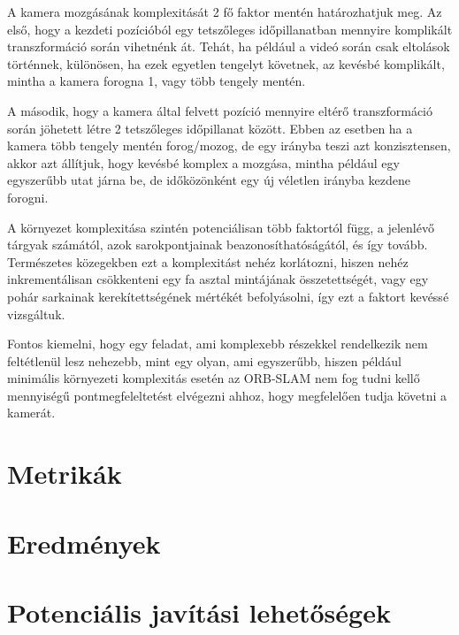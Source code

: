 A kamera mozgásának komplexitását 2 fő faktor mentén határozhatjuk meg.
Az első, hogy a kezdeti pozícióból egy tetszőleges időpillanatban mennyire komplikált transzformáció során vihetnénk át.
Tehát, ha például a videó során csak eltolások történnek, különösen, ha ezek egyetlen tengelyt követnek, az kevésbé komplikált, mintha a kamera forogna 1, vagy több tengely mentén.

A második, hogy a kamera által felvett pozíció mennyire eltérő transzformáció során jöhetett létre 2 tetszőleges időpillanat között.
Ebben az esetben ha a kamera több tengely mentén forog/mozog, de egy irányba teszi azt konzisztensen, akkor azt állítjuk, hogy kevésbé komplex a mozgása, mintha például egy egyszerűbb utat járna be, de időközönként egy új véletlen irányba kezdene forogni.

A környezet komplexitása szintén potenciálisan több faktortól függ, a jelenlévő tárgyak számától, azok sarokpontjainak beazonosíthatóságától, és így tovább.
Természetes közegekben ezt a komplexitást nehéz korlátozni, hiszen nehéz inkrementálisan csökkenteni egy fa asztal mintájának összetettségét, vagy egy pohár sarkainak kerekítettségének mértékét befolyásolni, így ezt a faktort kevéssé vizsgáltuk.

Fontos kiemelni, hogy egy feladat, ami komplexebb részekkel rendelkezik nem feltétlenül lesz nehezebb, mint egy olyan, ami egyszerűbb, hiszen például minimális környezeti komplexitás esetén az ORB-SLAM nem fog tudni kellő mennyiségű pontmegfeleltetést elvégezni ahhoz, hogy megfelelően tudja követni a kamerát.

\section{Metrikák}



\section{Eredmények}

\section{Potenciális javítási lehetőségek}

